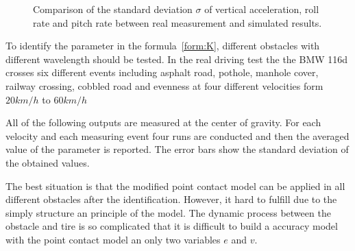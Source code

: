 \begin{figure}
 \label{fig:validation_events}
 \caption{Comparison of the standard deviation $\sigma$ of vertical acceleration, roll rate and pitch rate between real measurement and simulated results.}
 \end{figure}
 
 
 
 To identify the parameter in the formula~\ref{form:K}, different obstacles with different wavelength should be tested.
 In the real driving test the the BMW 116d crosses six different events including asphalt road, pothole, manhole cover, railway crossing, cobbled road and evenness at four different velocities form $20km/h$ to $60km/h$
 
 All of the following outputs are measured at the center of gravity. 
 For each velocity and each measuring event four runs are conducted and then the averaged value of the parameter is reported.
 The error bars show the standard deviation of the obtained values.
 
 The best situation is that the modified point contact model can be applied in all different obstacles after the identification.
 However, it hard to fulfill due to the simply structure an principle of the model.
 The dynamic process between the obstacle and tire is so complicated that it is difficult to build a accuracy model with the point contact model an only two variables $e$ and $v$.
 
